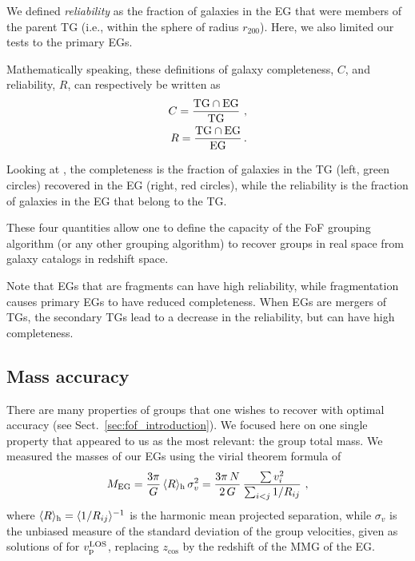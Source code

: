 We defined \emph{reliability} as the fraction of galaxies in the EG that were
members of the parent TG (i.e., within the sphere of radius $r_{200}$). Here,
we also limited our tests to the primary EGs.

Mathematically speaking, these definitions of galaxy completeness, $C$, and
reliability, $R$, can respectively be written as
%
\begin{eqnarray}
    C=\rm \frac{TG \cap EG}{TG} \ ,\nonumber\\
    R=\rm \frac{TG \cap EG}{EG} \,. \nonumber
\end{eqnarray}

Looking at , the completeness is the fraction of galaxies
in the TG (left, green circles) recovered in the EG (right, red circles), while
the reliability is the fraction of galaxies in the EG that belong to the TG\@.

These four quantities allow one to define the capacity of the FoF grouping
algorithm (or any other grouping algorithm) to recover groups in real space
from galaxy catalogs in redshift space.

Note that EGs that are fragments can have high reliability, while fragmentation
causes primary EGs to have reduced completeness. When EGs are mergers of TGs,
the secondary TGs lead to a decrease in the reliability, but can have high
completeness.

\subsection{Mass accuracy}

There are many properties of groups that one wishes to recover with optimal
accuracy (see Sect.~\ref{sec:fof_introduction}). We focused  here on one single
property that appeared to us as the most relevant: the group total mass. We
measured the masses of our EGs using the virial theorem formula of
\cite*{HTB85}
%
\begin{equation}
    M_{\rm EG} = {3\pi\over G}\,\langle R \rangle_{\rm h} \,\sigma_v^2
    = {3\pi\,N\over 2\,G}\,{\sum v_i^2\over \sum_{i<j} 1/R_{ij}}
    \ ,
\label{eq:MVT}
\end{equation}
%
where $\langle R \rangle_{\rm h} = \langle 1/R_{ij}\rangle^{-1}$ is the
harmonic mean projected separation, while $\sigma_v$ is the unbiased measure of
the standard deviation of the group velocities, given as solutions of
 for $v_{\rm p}^{\rm LOS}$, replacing $z_{\cos}$ by
the redshift of the MMG of the EG\@.

